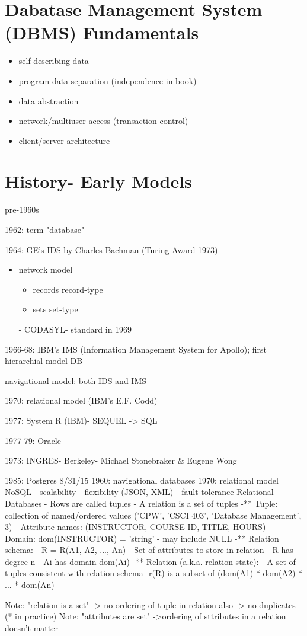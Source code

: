 \usepackage[12pt]{article}


\section{Dabatase Management System (DBMS) Fundamentals}
	\begin{itemize}
		\item self describing data
		\item program-data separation (independence in book)
		\item data abstraction
		\item network/multiuser access (transaction control)
		\item client/server architecture
	\end{itemize}

	\section{History- Early Models}
	\item pre-1960s
	\item 1962: term "database"
	\item 1964: GE's IDS by Charles Bachman (Turing Award 1973)
		\begin{itemize}
			\item network model
				\begin{itemize}
					\item records	record-type
					\item sets		set-type
				\end{itemize}
		- CODASYL- standard in 1969
		\end{itemize}
	\item 1966-68: IBM's IMS (Information Management System for Apollo); first hierarchial model DB
	\item navigational model: both IDS and IMS
	\item 1970: relational model (IBM's E.F. Codd)
	\item 1977: System R (IBM)- SEQUEL -> SQL
	\item 1977-79: Oracle
	\item 1973: INGRES- Berkeley- Michael Stonebraker \& Eugene Wong
	\item 1985: Postgres
													8/31/15
	1960: navigational databases
	1970: relational model
	NoSQL
		- scalability
		- flexibility (JSON, XML)
		- fault tolerance
Relational Databases
	- Rows are called tuples
	- A relation is a set of tuples
	-** Tuple: collection of named/ordered values ('CPW', 'CSCI 403', 'Database Management', 3)
		- Attribute names: 		    (INSTRUCTOR, COURSE ID, TITLE, HOURS)
		- Domain: dom(INSTRUCTOR) = 'string'
			- may include NULL
	-** Relation schema:
		- R = R(A1, A2, ..., An)
		- Set of attributes to store in relation
		- R has degree n
		- Ai has domain dom(Ai)
	-** Relation (a.k.a. relation state):
		- A set of tuples consistent with relation schema
		-r(R) is a subset of (dom(A1) * dom(A2) * ... * dom(An)

	Note: "relation is a set" -> no ordering of tuple in relation
		also -> no duplicates (* in practice)
	Note: "attributes are set" ->ordering of sttributes in a relation doesn't matter


